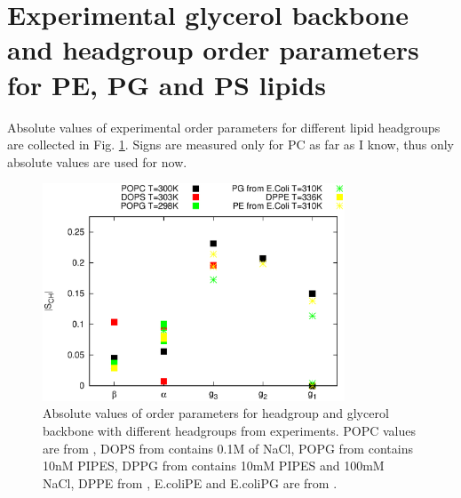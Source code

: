 \documentclass[aps,prl,superscriptaddress,twocolumn]{revtex4}
\begin{document}



\section{Experimental glycerol backbone and headgroup order parameters for PE, PG and PS lipids}

Absolute values of experimental order parameters for different lipid headgroups are
collected in Fig. \ref{HGorderParameters}. Signs are measured only for PC as far as I know,
thus only absolute values are used for now.
\begin{figure}[]
  \centering
  \includegraphics[width=9.0cm]{../Figs/HGorderparameters.eps}
  \caption{\label{HGorderParameters}
    Absolute values of order parameters for headgroup and glycerol backbone with different headgroups
    from experiments. POPC values are from \cite{ferreira13}, DOPS from \cite{browning80} contains 0.1M of NaCl,
    POPG from \cite{borle85} contains 10nM PIPES, DPPG from \cite{wohlgemuth80} contains  10mM PIPES and 100mM NaCl,
    DPPE from \cite{seelig76}, E.coliPE and E.coliPG are from \cite{gally81}.
  }
\end{figure}
\end{document}
